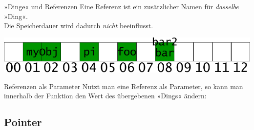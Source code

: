\begin{frame}[fragile]{»Dinge« und Referenzen}
	Eine Referenz ist ein zusätzlicher Namen für \emph{dasselbe} »Ding«.\\
	Die Speicherdauer wird dadurch \emph{nicht} beeinflusst.
	
	{\footnotesize
	\begin{block}{}
		
	\end{block}
	}
	
	\pause
	
	\includegraphics[width=\linewidth]{images/object_refs}
	
	\pause
	
	{\footnotesize
	\begin{block}{}
		
	\end{block}
	}
\end{frame}

\begin{frame}[fragile]{Referenzen als Parameter}
	Nutzt man eine Referenz als Parameter, so kann man innerhalb der Funktion den Wert des übergebenen »Dings« ändern:
	
	{\footnotesize
	\begin{block}{}
		
	\end{block}
	}
	
	\pause
	
	{\footnotesize
	\begin{block}{}
		
	\end{block}
	}
\end{frame}


\subsection{Pointer}

